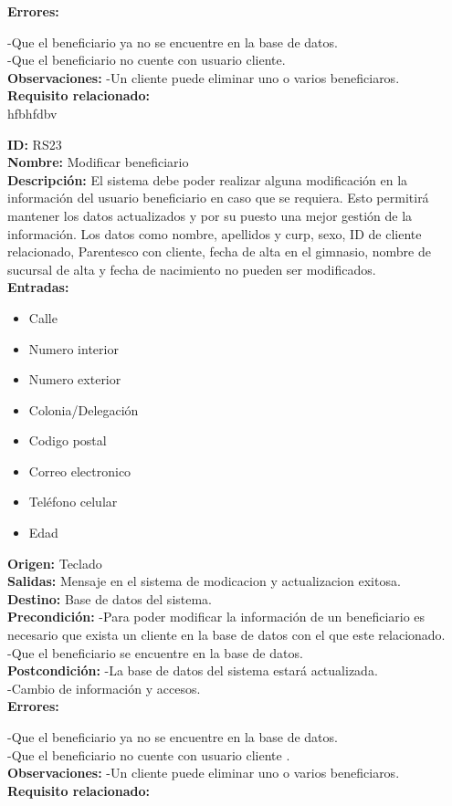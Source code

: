 \textbf{Errores: }

-Que el beneficiario ya  no se encuentre en la base de datos.\\
-Que el beneficiario no cuente con usuario cliente.\\

\textbf{Observaciones: }
-Un cliente puede eliminar  uno o varios beneficiaros.\\
\textbf{Requisito relacionado:} \\

hfbhfdbv

\textbf{ID:} RS23\\
\textbf{Nombre:} Modificar beneficiario\\
\textbf{Descripción:} El sistema debe poder realizar alguna modificación en la información del usuario beneficiario en caso que se requiera. Esto permitirá mantener los datos actualizados y por su puesto una mejor gestión de la información. Los datos como nombre, apellidos y curp, sexo, ID de cliente relacionado, Parentesco con cliente, fecha de alta en el gimnasio, nombre de sucursal de alta y fecha de nacimiento no pueden ser modificados.\\

\textbf{Entradas: }
        \begin{itemize}
         \item Calle 
         \item Numero interior 
         \item Numero exterior 
         \item Colonia/Delegación
         \item Codigo postal
         \item Correo electronico
         \item Teléfono celular
         \item Edad 

\end{itemize}
\textbf{Origen:} Teclado\\
\textbf{Salidas:} Mensaje en el sistema de modicacion y actualizacion exitosa.\\
\textbf{Destino:} Base de datos del sistema.\\
\textbf{Precondición: }
-Para poder modificar la información de un beneficiario es necesario que exista un cliente en la base de datos con el que este relacionado.\\
-Que el beneficiario  se encuentre en la base de datos.\\


\textbf{Postcondición: }
-La base de datos del sistema estará actualizada.\\
-Cambio de información y accesos.\\


\textbf{Errores: }

-Que el beneficiario ya  no se encuentre en la base de datos.\\
-Que el beneficiario no cuente con usuario cliente .\\


\textbf{Observaciones: }
-Un cliente puede eliminar  uno o varios beneficiaros.\\
\textbf{Requisito relacionado:} \\
